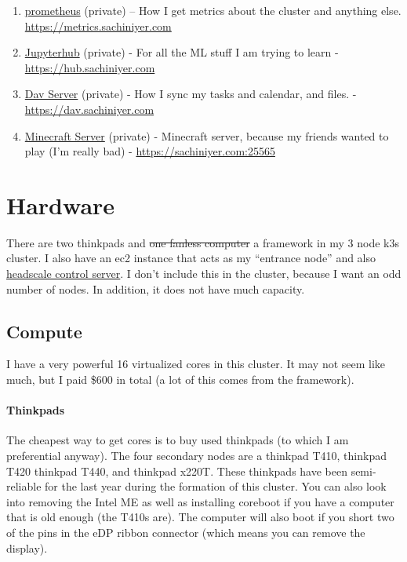 \documentclass[12pt]{article}
\begin{document}
\begin{enumerate}
  \item \href{https://prometheus.io/}{prometheus} (private) -- How I get metrics about the cluster and anything else. \href{https://metrics.sachiniyer.com}{https://metrics.sachiniyer.com}
  \item \href{https://jupyterhub.readthedocs.io/en/stable/installation-guide.html}{Jupyterhub} (private) - For all the ML stuff I am trying to learn - \href{https://hub.sachiniyer.com}{https://hub.sachiniyer.com}
  \item \href{https://sabre.io/baikal/}{Dav Server} (private) - How I sync my tasks and calendar, and files. - \href{https://dav.sachiniyer.com}{https://dav.sachiniyer.com}
  \item \href{https://sabre.io/baikal/}{Minecraft Server} (private) - Minecraft server, because my friends wanted to play (I'm really bad) - \href{https://sachiniyer.com:25565}{https://sachiniyer.com:25565}
\end{enumerate}

\section{Hardware}
There are two thinkpads and \sout{one fanless computer} a framework in my 3 node k3s cluster. I also have an ec2 instance that acts as my ``entrance node'' and also \hyperref[sec:Headscale]{headscale control server}. I don't include this in the cluster, because I want an odd number of nodes. In addition, it does not have much capacity.
\subsection{Compute}
I have a very powerful 16 virtualized cores in this cluster. It may not seem like much, but I paid \$600 in total (a lot of this comes from the framework).
\paragraph{Thinkpads}
The cheapest way to get cores is to buy used thinkpads (to which I am preferential anyway). The four secondary nodes are a thinkpad T410, thinkpad T420 thinkpad T440, and thinkpad x220T. These thinkpads have been semi-reliable for the last year during the formation of this cluster. You can also look into removing the Intel ME as well as installing coreboot if you have a computer that is old enough (the T410s are). The computer will also boot if you short two of the pins in the eDP ribbon connector (which means you can remove the display).
\end{document}
